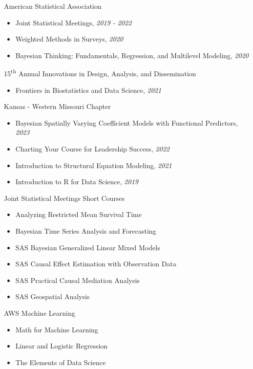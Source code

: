 
\Development
{American Statistical Association}
{\begin{itemize}
    \item Joint Statistical Meetings, \emph{2019 - 2022}
    \item Weighted Methods in Surveys, \emph{2020}
    \item Bayesian Thinking: Fundamentals, Regression, and Multilevel
        Modeling, \emph{2020}
\end{itemize}}

\vspace*{0.01 in}

\Development
{15\textsuperscript{th} Annual Innovations in Design, Analysis, and Dissemination}
{\begin{itemize}
    \item Frontiers in Biostatistics and Data Science, \emph{2021}
\end{itemize}}

\vspace*{0.01 in}

\Development
{Kansas - Western Missouri Chapter}
{\begin{itemize}
     \item Bayesian Spatially Varying Coefficient Models with Functional Predictors, \emph{2023}
     \item Charting Your Course for Leadership Success, \emph{2022}
     \item Introduction to Structural Equation Modeling, \emph{2021}
     \item Introduction to R for Data Science, \emph{2019}
\end{itemize}}

\vspace*{0.01 in}

\Development
{Joint Statistical Meetings Short Courses}
{\begin{itemize}
    \item Analyzing Restricted Mean Survival Time
    \item Bayesian Time Series Analysis and Forecasting
    \item SAS Bayesian Generalized Linear Mixed Models
    \item SAS Causal Effect Estimation with Observation Data
    \item SAS Practical Causal Mediation Analysis
    \item SAS Geospatial Analysis
\end{itemize}}

\vspace*{0.01 in}

\Development
{AWS Machine Learning}
{\begin{itemize}
    \item Math for Machine Learning
    \item Linear and Logistic Regression
    \item The Elements of Data Science
\end{itemize}}




